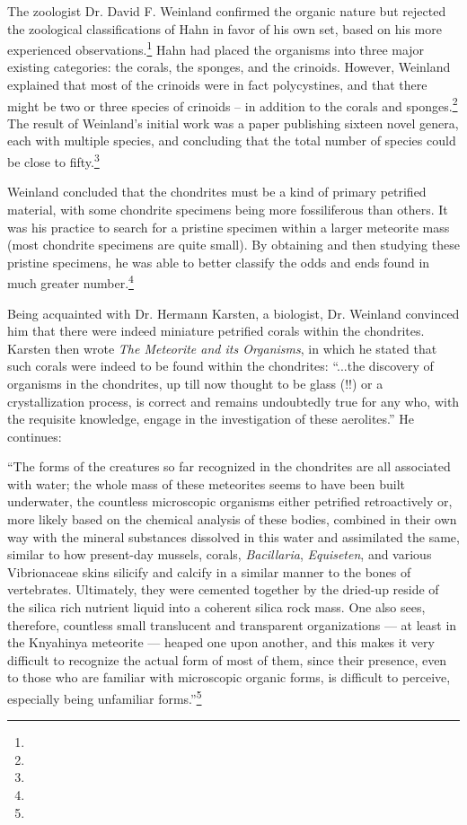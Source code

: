 \documentclass[a4paper, 12pt, oneside]{article}
\begin{document}
The zoologist Dr. David F. Weinland confirmed the organic nature but rejected the zoological classifications of Hahn in favor of his own set, based on his more experienced observations.\footnote{} Hahn had placed the organisms into three major existing categories: the corals, the sponges, and the crinoids. However, Weinland explained that most of the crinoids were in fact polycystines, and that there might be two or three species of crinoids -- in addition to the corals and sponges.\footnote{} The result of Weinland's initial work was a paper publishing sixteen novel genera, each with multiple species, and concluding that the total number of species could be close to fifty.\footnote{}

Weinland concluded that the chondrites must be a kind of primary petrified material, with some chondrite specimens being more fossiliferous than others. It was his practice to search for a pristine specimen within a larger meteorite mass (most chondrite specimens are quite small). By obtaining and then studying these pristine specimens, he was able to better classify the odds and ends found in much greater number.\footnote{}

Being acquainted with Dr. Hermann Karsten, a biologist, Dr. Weinland convinced him that there were indeed miniature petrified corals within the chondrites. Karsten then wrote \emph{The Meteorite and its Organisms}, in which he stated that such corals were indeed to be found within the chondrites: ``...the discovery of organisms in the chondrites, up till now thought to be glass (!!) or a crystallization process, is correct and remains undoubtedly true for any who, with the requisite knowledge, engage in the investigation of these aerolites.'' He continues:
\begin{displayquote}
``The forms of the creatures so far recognized in the chondrites are all associated with water; the whole mass of these meteorites seems to have been built underwater, the countless microscopic organisms either petrified retroactively or, more likely based on the chemical analysis of these bodies, combined in their own way with the mineral substances dissolved in this water and assimilated the same, similar to how present-day mussels, corals, \emph{Bacillaria}, \emph{Equiseten}, and various Vibrionaceae skins silicify and calcify in a similar manner to the bones of vertebrates. Ultimately, they were cemented together by the dried-up reside of the silica rich nutrient liquid into a coherent silica rock mass. One also sees, therefore, countless small translucent and transparent organizations --- at least in the Knyahinya meteorite --- heaped one upon another, and this makes it very difficult to recognize the actual form of most of them, since their presence, even to those who are familiar with microscopic organic forms, is difficult to perceive, especially being unfamiliar forms.''\footnote{}
\end{displayquote}
\end{document}
